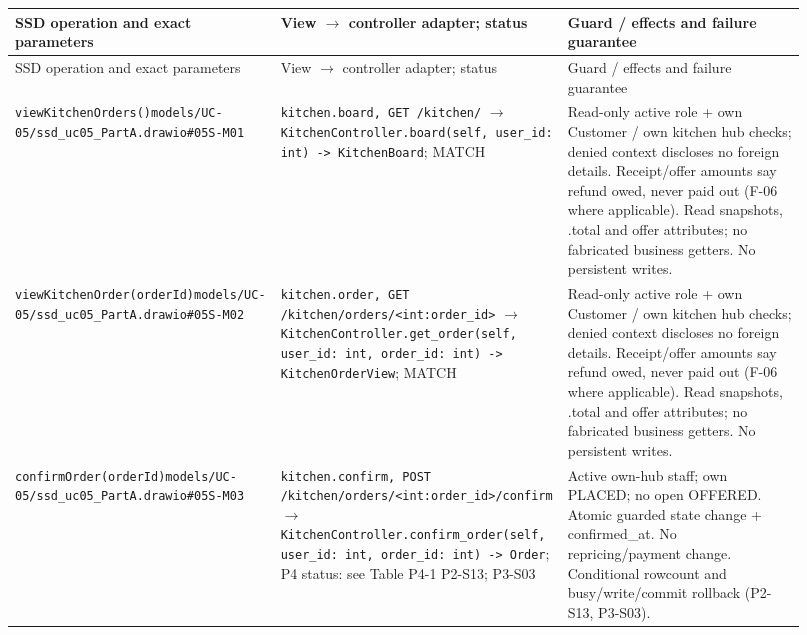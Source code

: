 \begin{longtable}{>{\raggedright\arraybackslash}p{0.3067\linewidth}>{\raggedright\arraybackslash}p{0.3067\linewidth}>{\raggedright\arraybackslash}p{0.3067\linewidth}}
SSD operation and exact parameters & View \ensuremath{\rightarrow} controller adapter; status & Guard / effects and failure guarantee \\
\hline\endfirsthead
SSD operation and exact parameters & View \ensuremath{\rightarrow} controller adapter; status & Guard / effects and failure guarantee \\
\hline\endhead
\texttt{viewKitchenOrders()}\newline{}\texttt{models/\allowbreak{}UC-05/\allowbreak{}ssd\_\allowbreak{}uc05\_\allowbreak{}PartA.\allowbreak{}drawio\#05S-M01} & \texttt{kitchen.\allowbreak{}board, GET /\allowbreak{}kitchen/\allowbreak{}} \ensuremath{\rightarrow} \texttt{KitchenController.\allowbreak{}board(self, user\_\allowbreak{}id: int) -\textgreater{} KitchenBoard}; MATCH & Read-only active role + own Customer / own kitchen hub checks; denied context discloses no foreign details. Receipt/offer amounts say refund owed, never paid out (F-06 where applicable). Read snapshots, .total and offer attributes; no fabricated business getters. No persistent writes. \\
\texttt{viewKitchenOrder(orderId)}\newline{}\texttt{models/\allowbreak{}UC-05/\allowbreak{}ssd\_\allowbreak{}uc05\_\allowbreak{}PartA.\allowbreak{}drawio\#05S-M02} & \texttt{kitchen.\allowbreak{}order, GET /\allowbreak{}kitchen/\allowbreak{}orders/\allowbreak{}\textless{}int:order\_\allowbreak{}id\textgreater{}} \ensuremath{\rightarrow} \texttt{KitchenController.\allowbreak{}get\_\allowbreak{}order(self, user\_\allowbreak{}id: int, order\_\allowbreak{}id: int) -\textgreater{} KitchenOrderView}; MATCH & Read-only active role + own Customer / own kitchen hub checks; denied context discloses no foreign details. Receipt/offer amounts say refund owed, never paid out (F-06 where applicable). Read snapshots, .total and offer attributes; no fabricated business getters. No persistent writes. \\
\texttt{confirmOrder(orderId)}\newline{}\texttt{models/\allowbreak{}UC-05/\allowbreak{}ssd\_\allowbreak{}uc05\_\allowbreak{}PartA.\allowbreak{}drawio\#05S-M03} & \texttt{kitchen.\allowbreak{}confirm, POST /\allowbreak{}kitchen/\allowbreak{}orders/\allowbreak{}\textless{}int:order\_\allowbreak{}id\textgreater{}/\allowbreak{}confirm} \ensuremath{\rightarrow} \texttt{KitchenController.\allowbreak{}confirm\_\allowbreak{}order(self, user\_\allowbreak{}id: int, order\_\allowbreak{}id: int) -\textgreater{} Order}; P4 status: see Table P4-1 P2-S13; P3-S03 & Active own-hub staff; own PLACED; no open OFFERED. Atomic guarded state change + confirmed\_at. No repricing/payment change. Conditional rowcount and busy/write/commit rollback (P2-S13, P3-S03). \\

\end{longtable}
